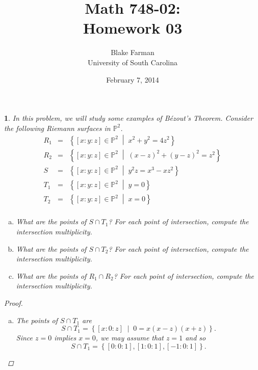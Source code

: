 \documentclass[10pt]{amsart}
\author{Blake Farman\\University of South Carolina}
\title{Math 748-02:\\Homework 03}
\date{February 7, 2014}
\begin{document}
\maketitle

\providecommand{\p}{\mathfrak{p}}
\providecommand{\m}{\mathfrak{m}}
\providecommand{\Deck}[1]{\operatorname{Deck}\left(#1\right)}

\newtheorem{thm}{}
\newtheorem{lem}{Lemma}
\newtheorem{prop}{Proposition}
\theoremstyle{definition}
\newtheorem{defn}{Definition}[thm]

\newcommand{\A}{\mathbb{A}}

\begin{thm}
  In this problem, we will study some examples of B\'{e}zout's Theorem.
  Consider the following Riemann surfaces in $\mathbb{P}^2$.
  \begin{eqnarray*}
    R_1 &=& \left\{ [x : y : z] \in \mathbb{P}^2 \;\middle\vert\; x^2 + y^2 = 4z^2 \right\}\\
    R_2 &=& \left\{ [x : y : z] \in \mathbb{P}^2 \;\middle\vert\; (x - z)^2 + (y - z)^2 = z^2 \right\}\\
    S &=& \left\{ [x : y : z] \in \mathbb{P}^2 \;\middle\vert\; y^2z = x^3 - xz^2\right\}\\
    T_1 &=& \left\{ [x : y : z] \in \mathbb{P}^2 \;\middle\vert\; y = 0 \right\}\\
    T_2 &=& \left\{ [x : y : z] \in \mathbb{P}^2 \;\middle\vert\; x = 0 \right\}\\
  \end{eqnarray*}
  \begin{enumerate}[(a)]
  \item
    What are the points of $S \cap T_1$?
    For each point of intersection, compute the intersection multiplicity.
  \item
    What are the points of $S \cap T_2$?
    For each point of intersection, compute the intersection multiplicity.
  \item
    What are the points of $R_1 \cap R_2$?
    For each point of intersection, compute the intersection multiplicity.
  \end{enumerate}

  \begin{proof}
    \begin{enumerate}[(a)]
    \item
      The points of $S \cap T_1$ are
      $$S \cap T_1 = \left\{ [x : 0 : z] \;\middle\vert\; 0 = x(x - z)(x + z)\right\}.$$
      Since $z = 0$ implies $x = 0$, we may assume that $z = 1$ and so
      $$S \cap T_1 = \left\{ [0 : 0 : 1], [1 : 0 : 1], [-1 : 0 : 1] \right\}.$$
      

\end{enumerate}
\end{proof}
\end{thm}
\end{document}
